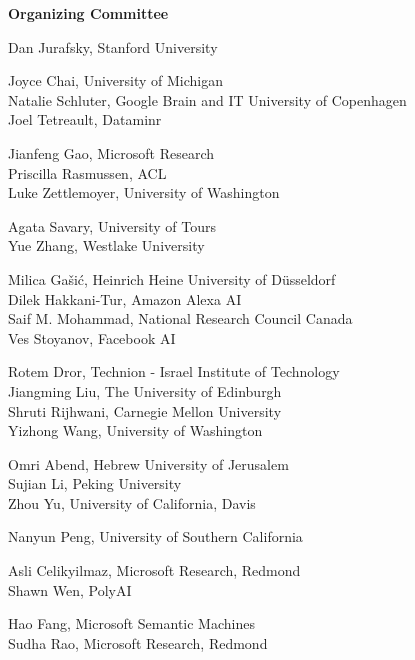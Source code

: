 \documentclass[11pt]{article}
\newcommand{\aclitem}[1][]{\item[#1:\vspace{2mm}]}
\begin{document}
\begin{center}
  {\Large \textbf{Organizing Committee}}
\end{center}

\begin{description}[itemsep=4mm, style=nextline]

\aclitem[General Chair]
Dan Jurafsky, Stanford University

\aclitem[Program Chairs]
Joyce Chai, University of Michigan\\
Natalie Schluter, Google Brain and IT University of Copenhagen\\
Joel Tetreault, Dataminr

\aclitem[Local Chairs]
Jianfeng Gao, Microsoft Research\\
Priscilla Rasmussen, ACL\\
Luke Zettlemoyer, University of Washington

\aclitem[Tutorial Chairs]
Agata Savary, University of Tours\\
Yue Zhang, Westlake University

\aclitem[Workshop Chairs]
Milica Ga\v{s}i\'{c}, Heinrich Heine University of D\"{u}sseldorf\\
Dilek Hakkani-Tur, Amazon Alexa AI\\
Saif M. Mohammad, National Research Council Canada\\
Ves Stoyanov, Facebook AI

\aclitem[Student Research Workshop Chairs]
Rotem Dror, Technion - Israel Institute of Technology\\
Jiangming Liu, The University of Edinburgh\\
Shruti Rijhwani, Carnegie Mellon University\\
Yizhong Wang, University of Washington

\aclitem[Faculty Advisors to the Student Research Workshop]
Omri Abend, Hebrew University of Jerusalem\\
Sujian Li, Peking University\\
Zhou Yu, University of California, Davis

\aclitem[Conference Handbook Chair]
Nanyun Peng, University of Southern California

\aclitem[Demonstration Chairs]
Asli Celikyilmaz, Microsoft Research, Redmond\\
Shawn Wen, PolyAI

\aclitem[Virtual Infrastructure Chairs]
Hao Fang, Microsoft Semantic Machines\\
Sudha Rao, Microsoft Research, Redmond 


\end{description}
\end{document}
